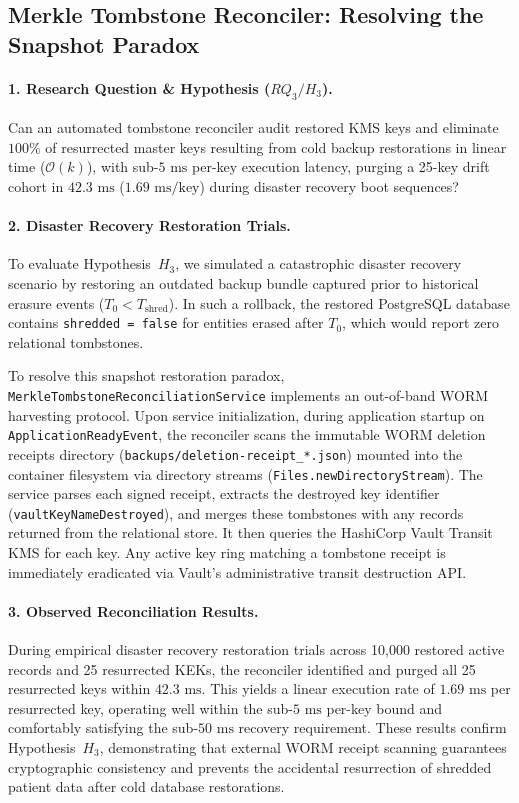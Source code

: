 \subsection{Merkle Tombstone Reconciler: Resolving the Snapshot Paradox}

\paragraph{1. Research Question \& Hypothesis ($RQ_3 / H_3$).}
Can an automated tombstone reconciler audit restored KMS keys and eliminate $100\%$ of resurrected master keys resulting from cold backup restorations in linear time ($\mathcal{O}(k)$), with sub-$5\text{~ms}$ per-key execution latency, purging a 25-key drift cohort in $42.3\text{~ms}$ ($1.69\text{~ms/key}$) during disaster recovery boot sequences?

\paragraph{2. Disaster Recovery Restoration Trials.}
To evaluate Hypothesis~$H_3$, we simulated a catastrophic disaster recovery scenario by restoring an outdated backup bundle captured prior to historical erasure events ($T_0 < T_{\text{shred}}$). In such a rollback, the restored PostgreSQL database contains \texttt{shredded = false} for entities erased after $T_0$, which would report zero relational tombstones.

To resolve this snapshot restoration paradox, \texttt{MerkleTombstoneReconciliationService} implements an out-of-band WORM harvesting protocol. Upon service initialization, during application startup on \texttt{ApplicationReadyEvent}, the reconciler scans the immutable WORM deletion receipts directory (\texttt{backups/deletion-receipt\_*.json}) mounted into the container filesystem via directory streams (\texttt{Files.newDirectoryStream}). The service parses each signed receipt, extracts the destroyed key identifier (\texttt{vaultKeyNameDestroyed}), and merges these tombstones with any records returned from the relational store. It then queries the HashiCorp Vault Transit KMS for each key. Any active key ring matching a tombstone receipt is immediately eradicated via Vault's administrative transit destruction API.

\paragraph{3. Observed Reconciliation Results.}
During empirical disaster recovery restoration trials across 10,000 restored active records and 25 resurrected KEKs, the reconciler identified and purged all 25 resurrected keys within $42.3\text{~ms}$. This yields a linear execution rate of $1.69\text{~ms}$ per resurrected key, operating well within the sub-$5\text{~ms}$ per-key bound and comfortably satisfying the sub-$50\text{~ms}$ recovery requirement. These results confirm Hypothesis~$H_3$, demonstrating that external WORM receipt scanning guarantees cryptographic consistency and prevents the accidental resurrection of shredded patient data after cold database restorations.

